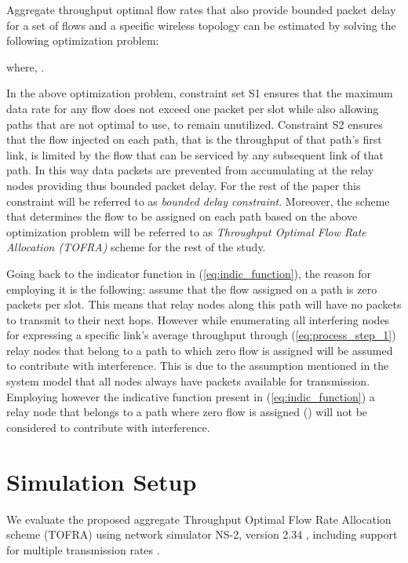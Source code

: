 \documentclass[conference]{IEEEtran}
\begin{document}
Aggregate throughput optimal flow rates that also provide bounded packet delay for a set of flows and a specific wireless topology can be
estimated by solving the following optimization problem:

where, .

In the above optimization problem, constraint set S1 ensures that the maximum data rate for any flow does not exceed one
packet per slot while also allowing paths that are
not optimal to use, to remain unutilized.
Constraint S2 ensures that the flow injected on each path, that is the throughput of that path's first link, is limited by the flow that
can be serviced by any subsequent link of that path. In this way data packets are prevented from accumulating at the relay nodes
providing thus bounded packet delay.
For the rest of the paper this constraint will be referred to as \textit{bounded delay constraint}.
Moreover, the scheme that determines the flow to be assigned on each path based on the above optimization problem
will be referred to as \textit{Throughput Optimal Flow Rate Allocation (TOFRA)} scheme for the rest of the study.

Going back to the indicator function in (\ref{eq:indic_function}), the reason for employing it is the following: assume that the flow assigned on
a path is zero packets per slot. This means that relay nodes along this path will have no packets to transmit to their next hops.
However while enumerating all interfering nodes for expressing a specific link's average throughput through (\ref{eq:process_step_1})
relay nodes that belong to a path to which zero flow is assigned will be assumed to contribute with interference. This is due to the assumption
mentioned in the system model that all nodes always have packets available for transmission. Employing however the indicative function present in
(\ref{eq:indic_function}) a relay node  that belongs to a path where zero flow is assigned () will not be considered
to contribute with interference.

\section{Simulation Setup}
\label{sec:sim_setup}

We evaluate the proposed aggregate Throughput Optimal Flow Rate Allocation scheme (TOFRA)
using network simulator NS-2, version 2.34 \cite{ref:ns2}, including support for multiple transmission rates \cite{ref:dei80211mr}.
\end{document}
